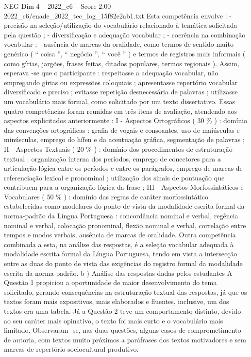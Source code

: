 \begin{textsample}{NEG Dim 4 – 2022\_c6 – Score 2.00 – 2022\_c6/enade\_2022\_tec\_log\_15f82e2ab1.txt}
Esta competência envolve : - precisão na seleção/utilização do vocabulário relacionado à temática solicitada pela questão ; - diversificação e adequação vocabular ; - coerência na combinação vocabular ; - ausência de marcas da oralidade, como termos de sentido muito genérico ( “ coisa ”, “ negócio ”, “ você ” ) e termos de registros mais informais ( como gírias, jargões, frases feitas, ditados populares, termos regionais ).
Assim, esperava -se que o participante : respeitasse a adequação vocabular, não empregando gírias ou expressões coloquiais ; apresentasse repertório vocabular diversificado e preciso ; evitasse repetição desnecessária de palavras ; utilizasse um vocabulário mais formal, como solicitado por um texto dissertativo.
Essas quatro competências foram reunidas em três itens de avaliação, atendendo aos aspectos explicitados anteriormente : I - Aspectos Ortográficos ( 30 \% ) : domínio das convenções ortográficas : grafia de vogais e consoantes, uso de maiúsculas e minúsculas, emprego do hífen e da acentuação gráfica, segmentação de palavras ; II - Aspectos Textuais ( 20 \% ) : domínio dos procedimentos de estruturação textual : organização interna dos períodos, emprego de conectores para a articulação lógica entre os períodos e entre os parágrafos, emprego de marcas de referenciação lexical e pronominal ; utilização dos sinais de pontuação que contribuem para a organização lógica da frase ; III - Aspectos Morfossintáticos e Vocabulares ( 50 \% ) : domínio das regras de caráter morfossintático estabelecidas como modelares do ponto de vista da modalidade escrita formal da norma-padrão da Língua Portuguesa : concordância nominal e verbal, regência nominal e verbal, colocação pronominal, flexão nominal e verbal, correlação entre tempos e modos verbais, ausência de marcas de oralidade.
Outra competência combinada a esta, na análise das respostas, é a seleção vocabular adequada à modalidade escrita formal da Língua Portuguesa, tendo em vista a intersecção entre as duas do ponto de vista das exigências do registro formal da modalidade escrita da norma-padrão. b ) Análise das respostas dadas pelos estudantes A Questão 1 propiciou a oportunidade de maior desenvolvimento do tema solicitado, gerando consequências na estruturação textual das respostas, já que os textos foram mais expositivos, mais elaborados e fluentes, inclusive, um dos textos era uma tabela.
Já a Questão 2 teve um comportamento distinto, devido ao seu caráter mais opinativo, o texto foi mais curto e o vocabulário mais limitado.
Observaram -se, nas duas questões, alguns casos de comprometimento de autoria, com textos muito próximos a paráfrases dos textos motivadores e sem marcas de repertório sociocultural produtivo.

\end{textsample}
